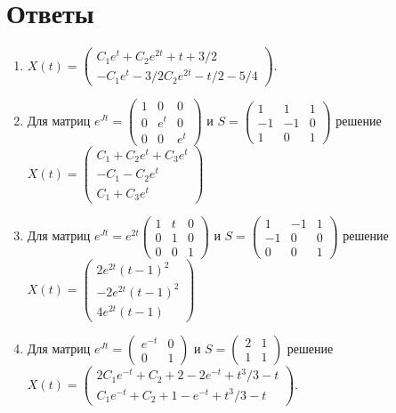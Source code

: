 \documentclass[a4paper, 12pt]{article}
\begin{document}
	\newpage\section*{Ответы}\begin{enumerate}
		\item $X(t) = \begin{pmatrix}
			C_1e^t+C_2e^{2t}+t+3/2\\
			-C_1e^t-3/2C_2e^{2t}-t/2-5/4
		\end{pmatrix}$.
		\item Для матриц $e^{Jt} = \begin{pmatrix}
			1 & 0 & 0\\
			0 & e^t & 0\\
			0 & 0 & e^t
		\end{pmatrix}$ и $S = \begin{pmatrix}
			1 & 1 & 1\\
			-1 & -1 & 0\\
			1 & 0 & 1
		\end{pmatrix}$ решение $X(t)=\begin{pmatrix}
		C_1 + C_2e^t + C_3e^t\\
		-C_1-C_2e^t\\
		C_1+C_3e^t
	\end{pmatrix}$
\item Для матриц $e^{Jt} = e^{2t}\begin{pmatrix}
	1 & t & 0\\
	0 & 1 & 0\\
	0 & 0 & 1
\end{pmatrix}$ и $S = \begin{pmatrix}
	1 & -1 & 1\\
	-1 & 0 & 0\\
	0 & 0 & 1
\end{pmatrix}$ решение $X(t)=\begin{pmatrix}
	2e^{2t}(t-1)^2\\-2e^{2t}(t-1)^2\\4e^{2t}(t-1)
\end{pmatrix}$
\item Для матриц $e^{Jt} = \begin{pmatrix}
	e^{-t} & 0\\
	0 & 1
\end{pmatrix}$ и $S = \begin{pmatrix}
2 & 1\\
1 & 1
\end{pmatrix}$ решение $X(t) = \begin{pmatrix}
	2C_1e^{-t} + C_2 + 2 - 2e^{-t} + t^3/3 - t\\
	C_1e^{-t} + C_2 + 1 - e^{-t} + t^3/3 - t
\end{pmatrix}.$
	\end{enumerate}
\end{document}
